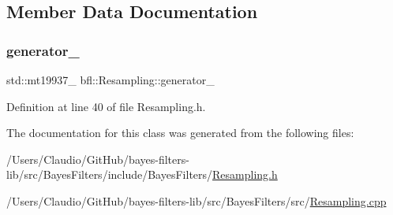 \subsection{Member Data Documentation}
\mbox{\label{classbfl_1_1Resampling_abfffdeeb6fc82608a4ff2fdae3c707f0}} 
\subsubsection{\texorpdfstring{generator\+\_\+}{generator\_}}
{\footnotesize\ttfamily std\+::mt19937\+\_ bfl\+::\+Resampling\+::generator\+\_\+\hspace{0.3cm}{\ttfamily [private]}}



Definition at line 40 of file Resampling.\+h.



The documentation for this class was generated from the following files\+:\begin{DoxyCompactItemize}
\item 
/\+Users/\+Claudio/\+Git\+Hub/bayes-\/filters-\/lib/src/\+Bayes\+Filters/include/\+Bayes\+Filters/\mbox{\hyperlink{Resampling_8h}{Resampling.\+h}}\item 
/\+Users/\+Claudio/\+Git\+Hub/bayes-\/filters-\/lib/src/\+Bayes\+Filters/src/\mbox{\hyperlink{Resampling_8cpp}{Resampling.\+cpp}}\end{DoxyCompactItemize}
